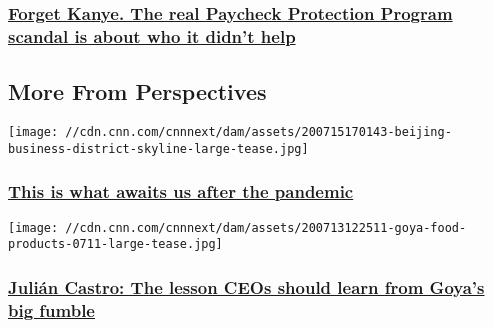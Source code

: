 \begin{itemize}
{  \subsubsection{\texorpdfstring{\href{/2020/07/15/perspectives/ppp-scandal-congress/index.html}{Forget
  Kanye. The real Paycheck Protection Program scandal is about who it
  didn't
  help}}{Forget Kanye. The real Paycheck Protection Program scandal is about who it didn't help}}\label{forget-kanye-the-real-paycheck-protection-program-scandal-is-about-who-it-didnt-help}}
\end{itemize}

\hypertarget{more-from-perspectives-}{%
\subsection{More From Perspectives~}\label{more-from-perspectives-}}

\href{/2020/07/16/perspectives/post-pandemic-outlook-ian-bremmer-imf/index.html}{}

\texttt{[image: //cdn.cnn.com/cnnnext/dam/assets/200715170143-beijing-business-district-skyline-large-tease.jpg]}

\hypertarget{this-is-what-awaits-us-after-the-pandemic}{%
\subsubsection{\texorpdfstring{\href{/2020/07/16/perspectives/post-pandemic-outlook-ian-bremmer-imf/index.html}{This
is what awaits us after the
pandemic}}{This is what awaits us after the pandemic}}\label{this-is-what-awaits-us-after-the-pandemic}}

\href{/2020/07/14/perspectives/goya-boycott-julian-castro/index.html}{}

\texttt{[image: //cdn.cnn.com/cnnnext/dam/assets/200713122511-goya-food-products-0711-large-tease.jpg]}

\hypertarget{juliuxe1n-castro-the-lesson-ceos-should-learn-from-goyas-big-fumble-}{%
\subsubsection{\texorpdfstring{\href{/2020/07/14/perspectives/goya-boycott-julian-castro/index.html}{Julián
Castro: The lesson CEOs should learn from Goya's big fumble
}}{Julián Castro: The lesson CEOs should learn from Goya's big fumble }}\label{juliuxe1n-castro-the-lesson-ceos-should-learn-from-goyas-big-fumble-}}

\href{/2020/07/14/perspectives/goya-boycott-julin-castro/index.html}{}

